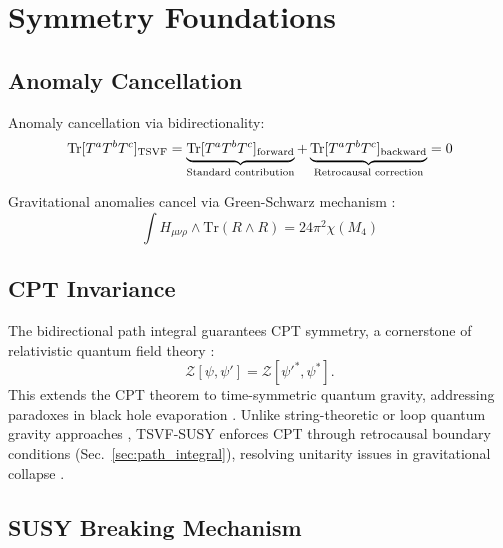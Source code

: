 \documentclass[twocolumn,superscriptaddress,floatfix]{revtex4-2}
\begin{document}
\section{Symmetry Foundations}  
\label{sec:symmetry}   

\subsection{Anomaly Cancellation}
\label{subsec:anomaly}
Anomaly cancellation via bidirectionality:
\begin{equation}
\text{Tr}[T^aT^bT^c]_{\rm TSVF} = \underbrace{\text{Tr}[T^aT^bT^c]_{\rm forward}}_{\text{Standard contribution}} + \underbrace{\text{Tr}[T^aT^bT^c]_{\rm backward}}_{\text{Retrocausal correction}} = 0
\label{eq:anomaly_cancellation}
\end{equation}

Gravitational anomalies cancel via Green-Schwarz mechanism \cite{Green:1984}:
\begin{equation}
\int H_{\mu\nu\rho} \wedge \text{Tr}(R \wedge R) = 24\pi^2\chi(M_4)
\label{eq:green_schwarz}
\end{equation}

\subsection{CPT Invariance}  
\label{subsec:cpt}    

The bidirectional path integral guarantees CPT symmetry, a cornerstone of relativistic quantum field theory \cite{Luders1957,Streater1964}:  
\begin{equation}  
\mathcal{Z}[\psi, \psi'] = \mathcal{Z}[\psi'^*, \psi^*].  
\label{eq:cpt_invariance}   
\end{equation}  
This extends the CPT theorem \cite{Pauli1955} to time-symmetric quantum gravity, addressing paradoxes in black hole evaporation \cite{Hawking1976}. Unlike string-theoretic or loop quantum gravity approaches \cite{Polchinski1998,Rovelli2004}, TSVF-SUSY enforces CPT through retrocausal boundary conditions (Sec.~\ref{sec:path_integral}), resolving unitarity issues in gravitational collapse \cite{Mathur2009}.  

\subsection{SUSY Breaking Mechanism}
\label{subsec:susy_breaking}
\end{document}
